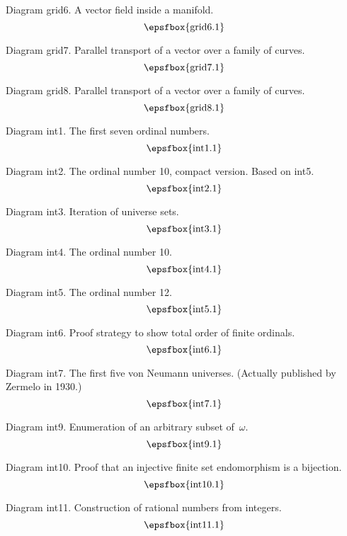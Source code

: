 Diagram grid6. A vector field inside a manifold.
$$
\centerline{\epsfbox{grid6.1}}
$$

Diagram grid7. Parallel transport of a vector over a family of curves.
$$
\centerline{\epsfbox{grid7.1}}
$$

\filleject

Diagram grid8. Parallel transport of a vector over a family of curves.
$$
\centerline{\epsfbox{grid8.1}}
$$

\secteject
\edef\SECTint{\the\pageno}

Diagram int1. The first seven ordinal numbers.
$$
\centerline{\epsfbox{int1.1}}
$$

Diagram int2. The ordinal number 10, compact version. Based on int5.
$$
\centerline{\epsfbox{int2.1}}
$$

Diagram int3. Iteration of universe sets.
$$
\centerline{\epsfbox{int3.1}}
$$

\filleject

Diagram int4. The ordinal number 10.
$$
\centerline{\epsfbox{int4.1}}
$$

\filleject

Diagram int5. The ordinal number 12.
$$
\centerline{\epsfbox{int5.1}}
$$

\filleject

Diagram int6. Proof strategy to show total order of finite ordinals.
$$
\centerline{\epsfbox{int6.1}}
$$

Diagram int7. The first five von Neumann universes. (Actually published by
Zermelo in 1930.)
$$
\centerline{\epsfbox{int7.1}}
$$

Diagram int9. Enumeration of an arbitrary subset of~$\omega$.
$$
\centerline{\epsfbox{int9.1}}
$$

Diagram int10. Proof that an injective finite set endomorphism is a bijection.
$$
\centerline{\epsfbox{int10.1}}
$$

\filleject

Diagram int11. Construction of rational numbers from integers.
$$
\centerline{\epsfbox{int11.1}}
$$

